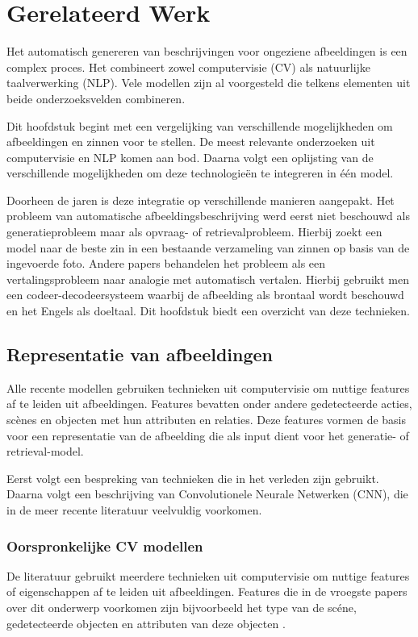 \chapter{Gerelateerd Werk}
\label{hoofdstuk:related}
Het automatisch genereren van beschrijvingen voor ongeziene afbeeldingen is een complex proces. Het combineert zowel computervisie (CV) als natuurlijke taalverwerking (NLP). Vele modellen zijn al voorgesteld die telkens elementen uit beide onderzoeksvelden combineren. 

Dit hoofdstuk begint met een vergelijking van verschillende mogelijkheden om afbeeldingen en zinnen voor te stellen. De meest relevante onderzoeken uit computervisie en NLP komen aan bod. Daarna volgt een oplijsting van de verschillende mogelijkheden om deze technologie\"en te integreren in \'e\'en model. 

Doorheen de jaren is deze integratie op verschillende manieren aangepakt. Het probleem van automatische afbeeldingsbeschrijving werd eerst niet beschouwd als generatieprobleem maar als opvraag- of retrievalprobleem. Hierbij zoekt een model naar de beste zin in een bestaande verzameling van zinnen op basis van de ingevoerde foto\cite{Hodosh2013}. Andere papers behandelen het probleem als een vertalingsprobleem naar analogie met automatisch vertalen. Hierbij gebruikt men een codeer-decodeersysteem waarbij de afbeelding als brontaal wordt beschouwd en het Engels als doeltaal. Dit hoofdstuk biedt een overzicht van deze technieken.

\section{Representatie van afbeeldingen}
Alle recente modellen gebruiken technieken uit computervisie om nuttige features af te leiden uit afbeeldingen. Features bevatten onder andere gedetecteerde acties, sc\`enes en objecten met hun attributen en relaties\cite{Bernardi}. Deze features vormen de basis voor een representatie van de afbeelding die als input dient voor het generatie- of retrieval-model.

Eerst volgt een bespreking van technieken die in het verleden zijn gebruikt. Daarna volgt een beschrijving van Convolutionele Neurale Netwerken (CNN), die in de meer recente literatuur veelvuldig voorkomen.


\subsection{Oorspronkelijke CV modellen}
De literatuur gebruikt meerdere technieken uit computervisie om nuttige features of eigenschappen af te leiden uit afbeeldingen. Features die in de vroegste papers over dit onderwerp voorkomen zijn bijvoorbeeld het type van de sc\'ene, gedetecteerde objecten en attributen van deze objecten \cite{Farhadi2010,Patterson2014,Yang2011}.

